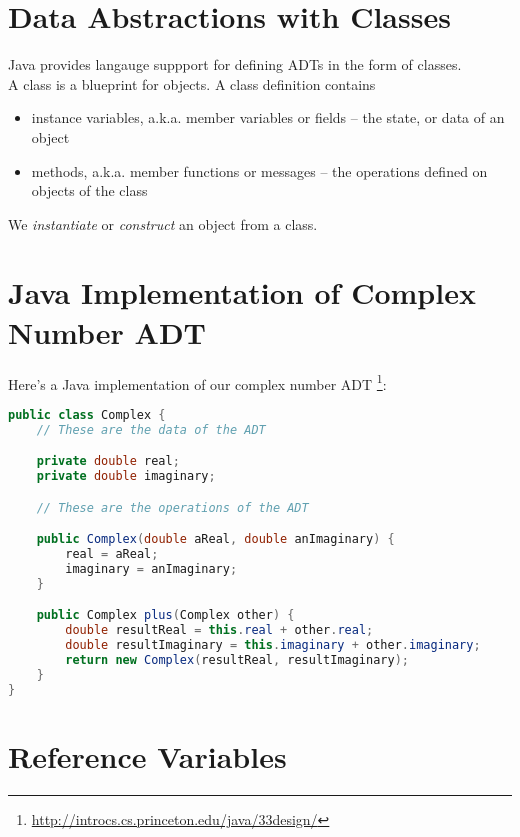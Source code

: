 \documentclass{article}
\begin{document}
\section{Data Abstractions with Classes}

Java provides langauge suppport for defining ADTs in the form of classes.\\

A class is a blueprint for objects.  A class definition contains
\begin{itemize}
\item instance variables, a.k.a. member variables or fields -- the state, or data of an object
\item methods, a.k.a. member functions or messages -- the operations defined on objects of the class
\end{itemize}
We {\em instantiate} or {\em construct} an object from a class.





\section{Java Implementation of Complex Number ADT}\label{complex-class}


Here's a Java implementation of our complex number ADT \footnote{\url{http://introcs.cs.princeton.edu/java/33design/}}:

\begin{lstlisting}[language=Java]
public class Complex {
    // These are the data of the ADT

    private double real;
    private double imaginary;

    // These are the operations of the ADT

    public Complex(double aReal, double anImaginary) {
        real = aReal;
        imaginary = anImaginary;
    }

    public Complex plus(Complex other) {
        double resultReal = this.real + other.real;
        double resultImaginary = this.imaginary + other.imaginary;
        return new Complex(resultReal, resultImaginary);
    }
}
\end{lstlisting}






\section{Reference Variables}
\end{document}
